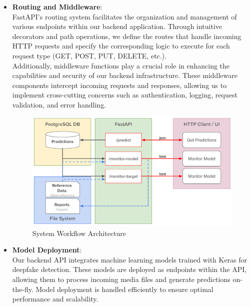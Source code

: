 \begin{itemize}
      \item \textbf{Routing and Middleware}:\\
            FastAPI's routing system facilitates the organization and management of various endpoints within our backend application. Through intuitive decorators and path operations, we define the routes that handle incoming HTTP requests and specify the corresponding logic to execute for each request type (GET, POST, PUT, DELETE, etc.).\\

            Additionally, middleware functions play a crucial role in enhancing the capabilities and security of our backend infrastructure. These middleware components intercept incoming requests and responses, allowing us to implement cross-cutting concerns such as authentication, logging, request validation, and error handling.\\

            \begin{figure}[htbp]
                  \centering
                  \includegraphics[width=6in]{img/image_2024-02-23_19-12-39.png}
                  \caption{System Workflow Architecture}
            \end{figure}

      \item \textbf{Model Deployment}:\\
            Our backend API integrates machine learning models trained with Keras for deepfake detection. These models are deployed as endpoints within the API, allowing them to process incoming media files and generate predictions on-the-fly. Model deployment is handled efficiently to ensure optimal performance and scalability.\\

\end{itemize}


\newpage